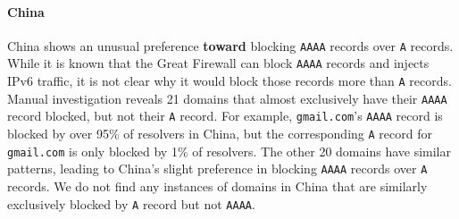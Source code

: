 



\paragraph{China}
China shows an unusual preference \textbf{toward} blocking \texttt{AAAA}
records over \texttt{A} records. While it is known that the Great Firewall
can block \texttt{AAAA} records and injects IPv6 traffic, it is not clear why it
would block those records more than \texttt{A} records. Manual investigation reveals
21 domains that almost exclusively have their \texttt{AAAA} record blocked, but
not their \texttt{A} record. For example, \texttt{gmail.com}'s \texttt{AAAA}
record is blocked by over 95\% of resolvers in China, but the corresponding
\texttt{A} record for \texttt{gmail.com} is only blocked by 1\% of resolvers.
The other 20 domains have similar patterns, leading to China's slight preference
in blocking \texttt{AAAA} records over \texttt{A} records. We do not find any
instances of domains in China that are similarly exclusively blocked by
\texttt{A} record but not \texttt{AAAA}.








